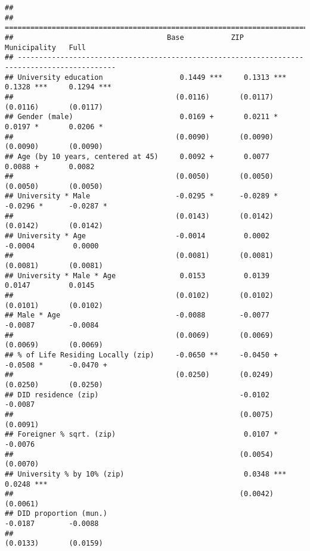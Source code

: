 \documentclass[
]{article}
\begin{document}
\begin{verbatim}
## 
## =============================================================================================
##                                    Base           ZIP            Municipality   Full         
## ---------------------------------------------------------------------------------------------
## University education                  0.1449 ***     0.1313 ***     0.1328 ***     0.1294 ***
##                                      (0.0116)       (0.0117)       (0.0116)       (0.0117)   
## Gender (male)                         0.0169 +       0.0211 *       0.0197 *       0.0206 *  
##                                      (0.0090)       (0.0090)       (0.0090)       (0.0090)   
## Age (by 10 years, centered at 45)     0.0092 +       0.0077         0.0088 +       0.0082    
##                                      (0.0050)       (0.0050)       (0.0050)       (0.0050)   
## University * Male                    -0.0295 *      -0.0289 *      -0.0296 *      -0.0287 *  
##                                      (0.0143)       (0.0142)       (0.0142)       (0.0142)   
## University * Age                     -0.0014         0.0002        -0.0004         0.0000    
##                                      (0.0081)       (0.0081)       (0.0081)       (0.0081)   
## University * Male * Age               0.0153         0.0139         0.0147         0.0145    
##                                      (0.0102)       (0.0102)       (0.0101)       (0.0102)   
## Male * Age                           -0.0088        -0.0077        -0.0087        -0.0084    
##                                      (0.0069)       (0.0069)       (0.0069)       (0.0069)   
## % of Life Residing Locally (zip)     -0.0650 **     -0.0450 +      -0.0508 *      -0.0470 +  
##                                      (0.0250)       (0.0249)       (0.0250)       (0.0250)   
## DID residence (zip)                                 -0.0102                       -0.0087    
##                                                     (0.0075)                      (0.0091)   
## Foreigner % sqrt. (zip)                              0.0107 *                     -0.0076    
##                                                     (0.0054)                      (0.0070)   
## University % by 10% (zip)                            0.0348 ***                    0.0248 ***
##                                                     (0.0042)                      (0.0061)   
## DID proportion (mun.)                                              -0.0187        -0.0088    
##                                                                    (0.0133)       (0.0159)   

\end{verbatim}
\end{document}
